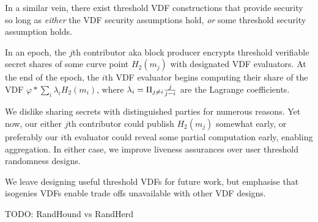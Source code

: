 \documentclass{article}
\begin{document}
In a similar vein, there exist threshold VDF constructions that
provide security so long as {\it either} the VDF security assumptions
hold, {\it or} some threshold security assumption holds. 

In an epoch, the $j$th contributor aka block producer encrypts
threshold verifiable secret shares \cite{Schoenmakers99asimple} %
of some curve point $H_2(m_j)$ with designated VDF evaluators.
At the end of the epoch, the $i$th VDF evaluator begins computing
their share of the VDF  $φ* \sum_i \lambda_i H_2(m_i)$, where
$\lambda_i = \Pi_{j \neq i} {j \over j-i}$ are the Lagrange coefficients.

We dislike sharing secrets with distinguished parties for numerous
reasons.  Yet now, our either $j$th contributor could publish $H_2(m_j)$
somewhat early, or preferably our $i$th evaluator could reveal some
partial computation early, enabling aggregation.  In either case,
we improve liveness assurances over user threshold randomness designs.

We leave designing useful threshold VDFs for future work, but emphasise
that isogenies VDFs enable trade offs unavailable with other VDF designs. 

TODO: RandHound vs RandHerd



\end{document}
